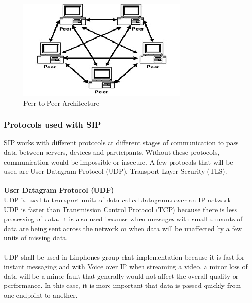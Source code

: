 \documentclass[a4paper]{article}
\begin{document}
\begin{center}
\begin{figure}[H]
\includegraphics[width=1\linewidth]{./pictures/peer.JPG}
\caption{\label{fig:Peer-to-Peer Architecture} Peer-to-Peer Architecture}
\end{figure}
\end{center}

\subsubsection{Protocols used with SIP}
SIP works with different protocols at different stages of communication to pass data between servers, devices and participants. Without these protocols, communication would be impossible or insecure. A few protocols that will be used are User Datagram Protocol (UDP), Transport Layer Security (TLS).\\
\\
\textbf{User Datagram Protocol (UDP)\\}
UDP is used to transport units of data called datagrams over an IP network. UDP is faster than Transmission Control Protocol (TCP) because there is less processing of data. It is also used because when messages with small amounts of data are being sent across the network or when data will be unaffected by a few units of missing data.\\
\\
UDP shall be used in Linphones group chat implementation because it is fast for instant messaging and with Voice over IP when streaming a video, a minor loss of data will be a minor fault that generally would not affect the overall quality or performance. In this case, it is more important that data is passed quickly from one endpoint to another.\\
\\
\end{document}
